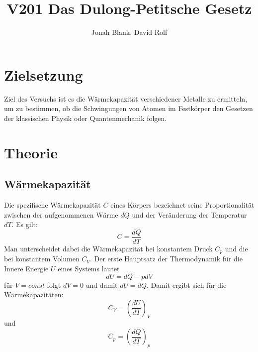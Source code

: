 \documentclass[12pt,a4paper]{article}
\author{Jonah Blank, David Rolf}
\title{V201 Das Dulong-Petitsche Gesetz}
\begin{document}
\maketitle\newpage

\section{Zielsetzung}
Ziel des Versuchs ist es die Wärmekapazität verschiedener Metalle zu ermitteln, um zu bestimmen, ob die Schwingungen von Atomen im Festkörper den Gesetzen der klassischen Physik oder Quantenmechanik folgen.
\section{Theorie}
\subsection{Wärmekapazität}
Die spezifische Wärmekapazität $C$ eines Körpers bezeichnet seine Proportionalität zwischen der aufgenommenen Wärme $dQ$ und der Veränderung der Temperatur $dT$.
Es gilt:
\begin{equation}
C = \frac{dQ}{dT}
\end{equation}
Man unterscheidet dabei die Wärmekapazität bei konstantem Druck $C_p$ und die bei konstantem Volumen $C_V$.
Der erste Hauptsatz der Thermodynamik für die Innere Energie $U$ eines Systems lautet \[dU=dQ-pdV\]
für $V = const$ folgt $dV = 0$ und damit $dU = dQ$.
Damit ergibt sich für die Wärmekapazitäten:
\begin{equation}
C_V = \left(\frac{dU}{dT}\right)_V
\end{equation}
und 
\begin{equation}
C_p = \left(\frac{dQ}{dT}\right)_p
\end{equation}
\end{document}
